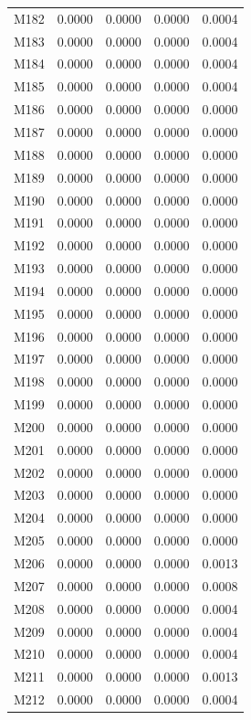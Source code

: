 \begin{longtable}{lrrrr}
M182 & 0.0000 & 0.0000 & 0.0000 & 0.0004 \\
M183 & 0.0000 & 0.0000 & 0.0000 & 0.0004 \\
M184 & 0.0000 & 0.0000 & 0.0000 & 0.0004 \\
M185 & 0.0000 & 0.0000 & 0.0000 & 0.0004 \\
M186 & 0.0000 & 0.0000 & 0.0000 & 0.0000 \\
M187 & 0.0000 & 0.0000 & 0.0000 & 0.0000 \\
M188 & 0.0000 & 0.0000 & 0.0000 & 0.0000 \\
M189 & 0.0000 & 0.0000 & 0.0000 & 0.0000 \\
M190 & 0.0000 & 0.0000 & 0.0000 & 0.0000 \\
M191 & 0.0000 & 0.0000 & 0.0000 & 0.0000 \\
M192 & 0.0000 & 0.0000 & 0.0000 & 0.0000 \\
M193 & 0.0000 & 0.0000 & 0.0000 & 0.0000 \\
M194 & 0.0000 & 0.0000 & 0.0000 & 0.0000 \\
M195 & 0.0000 & 0.0000 & 0.0000 & 0.0000 \\
M196 & 0.0000 & 0.0000 & 0.0000 & 0.0000 \\
M197 & 0.0000 & 0.0000 & 0.0000 & 0.0000 \\
M198 & 0.0000 & 0.0000 & 0.0000 & 0.0000 \\
M199 & 0.0000 & 0.0000 & 0.0000 & 0.0000 \\
M200 & 0.0000 & 0.0000 & 0.0000 & 0.0000 \\
M201 & 0.0000 & 0.0000 & 0.0000 & 0.0000 \\
M202 & 0.0000 & 0.0000 & 0.0000 & 0.0000 \\
M203 & 0.0000 & 0.0000 & 0.0000 & 0.0000 \\
M204 & 0.0000 & 0.0000 & 0.0000 & 0.0000 \\
M205 & 0.0000 & 0.0000 & 0.0000 & 0.0000 \\
M206 & 0.0000 & 0.0000 & 0.0000 & 0.0013 \\
M207 & 0.0000 & 0.0000 & 0.0000 & 0.0008 \\
M208 & 0.0000 & 0.0000 & 0.0000 & 0.0004 \\
M209 & 0.0000 & 0.0000 & 0.0000 & 0.0004 \\
M210 & 0.0000 & 0.0000 & 0.0000 & 0.0004 \\
M211 & 0.0000 & 0.0000 & 0.0000 & 0.0013 \\
M212 & 0.0000 & 0.0000 & 0.0000 & 0.0004 \\

\end{longtable}
